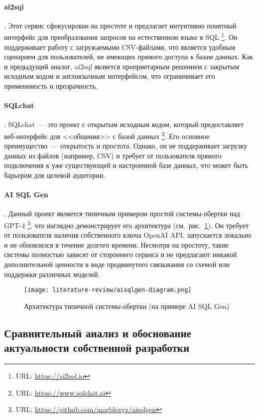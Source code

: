 \paragraph{ai2sql}. Этот сервис сфокусирован на простоте и предлагает интуитивно
понятный интерфейс для преобразования запросов на естественном языке в SQL
\footnote{URL: \url{https://ai2sql.io}}. Он поддерживает работу с загружаемыми CSV-файлами,
что является удобным сценарием для пользователей, не имеющих прямого доступа к базам данных.
Как и предыдущий аналог, ai2sql является проприетарным решением с закрытым исходным кодом и
англоязычным интерфейсом, что ограничивает его применимость и прозрачность.

\paragraph{SQLchat}. SQLchat~--- это проект с открытым исходным кодом,
который предоставляет веб-интерфейс для <<общения>> с базой данных
\footnote{URL: \url{https://www.sqlchat.ai}}. Его основное преимущество~--- открытость и простота.
Однако, он не поддерживает загрузку данных из файлов (например, CSV) и требует от пользователя
прямого подключения к уже существующей и настроенной базе данных, что может быть барьером для
целевой аудитории.

\paragraph{AI SQL Gen}. Данный проект является типичным примером простой системы-обертки над
GPT-4 \footnote{URL: \url{https://github.com/marblexyz/aisqlgen}}, что наглядно демонстрирует его
архитектура (см.~рис.~\ref{fig:aisqlgen_arch}). Он требует от пользователя
наличия собственного ключа OpenAI API, запускается локально и не обновлялся в течение долгого
времени. Несмотря на простоту, такие системы полностью зависят от стороннего сервиса и не
предлагают никакой дополнительной ценности в виде продвинутого связывания со схемой или
поддержки различных моделей.

\begin{figure}[ht]
      \begin{center}
            \texttt{[image: literature-review/aisqlgen-diagram.png]}
      \end{center}
      \caption{Архитектура типичной системы-обертки (на примере AI SQL Gen)}
      \label{fig:aisqlgen_arch}
\end{figure}

\subsection{Сравнительный анализ и обоснование актуальности собственной разработки}

